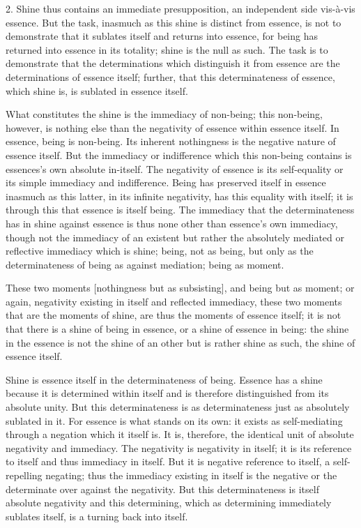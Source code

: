 2. Shine thus contains an immediate presupposition,
an independent side vis-à-vis essence.
But the task, inasmuch as this shine is distinct from essence,
is not to demonstrate that it sublates itself
and returns into essence,
for being has returned into essence in its totality;
shine is the null as such.
The task is to demonstrate that the determinations which
distinguish it from essence are the determinations of essence itself;
further, that this determinateness of essence,
which shine is, is sublated in essence itself.

What constitutes the shine is
the immediacy of non-being;
this non-being, however, is nothing else than
the negativity of essence within essence itself.
In essence, being is non-being.
Its inherent nothingness is the
negative nature of essence itself.
But the immediacy or indifference
which this non-being contains is
essences's own absolute in-itself.
The negativity of essence is its self-equality
or its simple immediacy and indifference.
Being has preserved itself in essence inasmuch
as this latter, in its infinite negativity,
has this equality with itself;
it is through this that essence is itself being.
The immediacy that the determinateness has
in shine against essence is
thus none other than essence's own immediacy,
though not the immediacy of an existent
but rather the absolutely mediated
or reflective immediacy which is shine;
being, not as being, but only as
the determinateness of being as against mediation;
being as moment.

These two moments [nothingness but as subsisting],
and being but as moment;
or again, negativity existing in itself and reflected immediacy,
these two moments that are the moments of shine,
are thus the moments of essence itself;
it is not that there is a shine of being in essence,
or a shine of essence in being:
the shine in the essence is not the shine of an other
but is rather shine as such, the shine of essence itself.

Shine is essence itself in the determinateness of being.
Essence has a shine because it is determined within itself
and is therefore distinguished from its absolute unity.
But this determinateness is as determinateness
just as absolutely sublated in it.
For essence is what stands on its own:
it exists as self-mediating through a negation which it itself is.
It is, therefore, the identical unit of
absolute negativity and immediacy.
The negativity is negativity in itself;
it is its reference to itself and thus immediacy in itself.
But it is negative reference to itself,
a self-repelling negating;
thus the immediacy existing in itself is
the negative or the determinate over against the negativity.
But this determinateness is itself absolute negativity
and this determining, which as determining immediately sublates itself,
is a turning back into itself.

